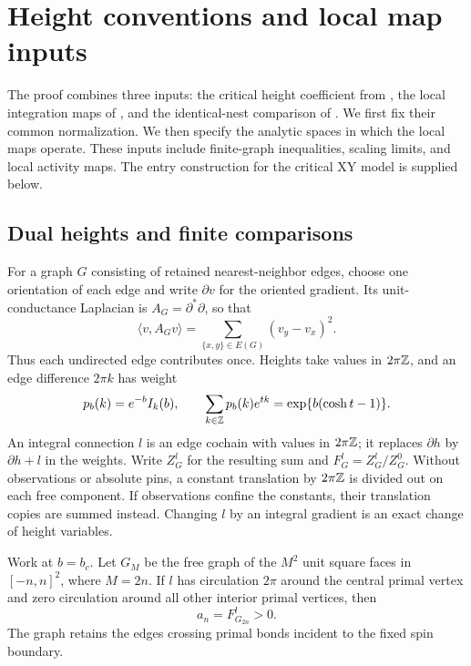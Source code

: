 \section{Height conventions and local map inputs}\label{sec:inputs}

The proof combines three inputs: the critical height coefficient from
\cite{X}, the local integration maps of \cite{B}, and the identical-nest
comparison of \cite{S}.  We first fix their common
normalization.  We then specify the analytic spaces in which the local
maps operate. These inputs include finite-graph inequalities, scaling
limits, and local activity maps. The entry construction for the critical
XY model is supplied below.

\subsection{Dual heights and finite comparisons}

For a graph \(G\) consisting of retained nearest-neighbor edges, choose
one orientation of each edge and write \(\partial v\) for the oriented
gradient.  Its unit-conductance Laplacian is \(A_G=\partial^*\partial\),
so that
\begin{equation}\label{inp:energy-convention}
 \langle v,A_Gv\rangle=\sum_{\{x,y\}\in E(G)}(v_y-v_x)^2.
\end{equation}
Thus each undirected edge contributes once.  Heights take values in
\(2\pi\mathbb Z\), and an edge difference \(2\pi k\) has weight
\[
 p_b(k)=e^{-b}I_k(b),\qquad
 \sum_{k\in\mathbb Z}p_b(k)e^{tk}=\exp\{b(\cosh t-1)\}.
\]
An integral connection \(l\) is an edge cochain with values in
\(2\pi\mathbb Z\); it replaces \(\partial h\) by \(\partial h+l\) in
the weights.  Write \(Z_G^l\) for the resulting sum and
\(F_G^l=Z_G^l/Z_G^0\).  Without observations or absolute pins, a
constant translation by \(2\pi\mathbb Z\) is divided out on each free
component.  If observations confine the constants, their translation
copies are summed instead.  Changing \(l\) by an integral gradient is
an exact change of height variables.

\begin{lemma}\label{inp:duality}
Work at \(b=b_c\).  Let \(G_M\) be the free graph of the \(M^2\) unit square faces in
\([-n,n]^2\), where \(M=2n\).  If \(l\) has circulation \(2\pi\)
around the central primal vertex and zero circulation around all
other interior primal vertices, then
\[
                         a_n=F_{G_{2n}}^l>0.
\]
The graph retains the edges crossing primal bonds incident to the
fixed spin boundary.
\end{lemma}

